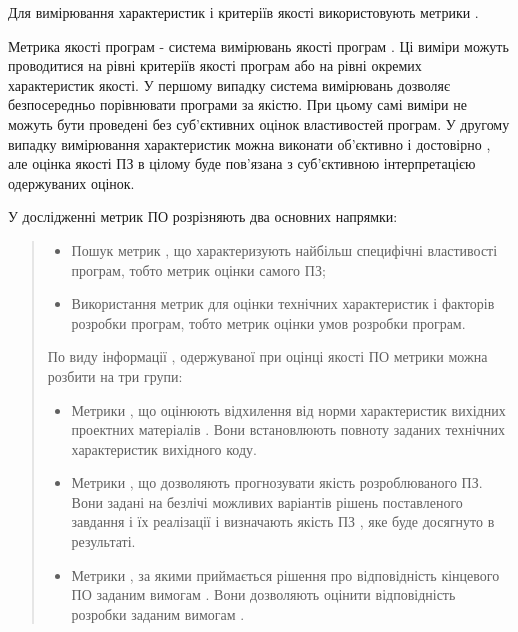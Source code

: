 \documentclass[oneside,final,14pt]{extreport}
\begin{document}
Для вимірювання характеристик і критеріїв якості використовують метрики .

Метрика якості програм - система вимірювань якості програм . Ці виміри можуть проводитися на рівні критеріїв якості програм або на рівні окремих характеристик якості. У першому випадку система вимірювань дозволяє безпосередньо порівнювати програми за якістю. При цьому самі виміри не можуть бути проведені без суб'єктивних оцінок властивостей програм. У другому випадку вимірювання характеристик можна виконати об'єктивно і достовірно , але оцінка якості ПЗ в цілому буде пов'язана з суб'єктивною інтерпретацією одержуваних оцінок.

У дослідженні метрик ПО розрізняють два основних напрямки:
\begin{quote}
\begin{itemize}
\item {} 
Пошук метрик , що характеризують найбільш специфічні властивості програм, тобто метрик оцінки самого ПЗ;

\item {} 
Використання метрик для оцінки технічних характеристик і факторів розробки програм, тобто метрик оцінки умов розробки програм.

\end{itemize}

По виду інформації , одержуваної при оцінці якості ПО метрики можна розбити на три групи:
\begin{itemize}
\item {} 
Метрики , що оцінюють відхилення від норми характеристик вихідних проектних матеріалів . Вони встановлюють повноту заданих технічних характеристик вихідного коду.

\item {} 
Метрики , що дозволяють прогнозувати якість розроблюваного ПЗ. Вони задані на безлічі можливих варіантів рішень поставленого завдання і їх реалізації і визначають якість ПЗ , яке буде досягнуто в результаті.

\item {} 
Метрики , за якими приймається рішення про відповідність кінцевого ПО заданим вимогам . Вони дозволяють оцінити відповідність розробки заданим вимогам .

\end{itemize}
\end{quote}
\end{document}
